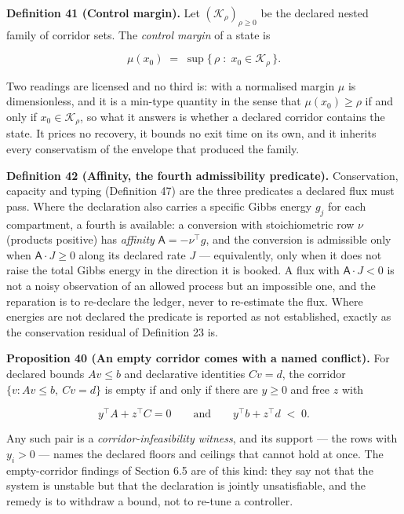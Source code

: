 \documentclass[11pt]{article}
\begin{document}
\textbf{Definition 41 (Control margin).} Let \((\mathcal K_\rho)_{\rho \ge 0}\) be the declared nested family of corridor sets. The \emph{control margin} of a state is 

$$\mu(x_0) \;=\; \sup\{\, \rho \;:\; x_0 \in \mathcal K_\rho \,\}.$$

 Two readings are licensed and no third is: with a normalised margin \(\mu\) is dimensionless, and it is a min-type quantity in the sense that \(\mu(x_0) \ge \rho\) if and only if \(x_0 \in \mathcal K_\rho\), so what it answers is whether a declared corridor contains the state. It prices no recovery, it bounds no exit time on its own, and it inherits every conservatism of the envelope that produced the family.

\textbf{Definition 42 (Affinity, the fourth admissibility predicate).} Conservation, capacity and typing (Definition 47) are the three predicates a declared flux must pass. Where the declaration also carries a specific Gibbs energy \(g_j\) for each compartment, a fourth is available: a conversion with stoichiometric row \(\nu\) (products positive) has \emph{affinity} \(\mathsf{A} = -\nu^{\top} g\), and the conversion is admissible only when \(\mathsf{A} \cdot J \ge 0\) along its declared rate \(J\) --- equivalently, only when it does not raise the total Gibbs energy in the direction it is booked. A flux with \(\mathsf{A} \cdot J < 0\) is not a noisy observation of an allowed process but an impossible one, and the reparation is to re-declare the ledger, never to re-estimate the flux. Where energies are not declared the predicate is reported as not established, exactly as the conservation residual of Definition 23 is.

\textbf{Proposition 40 (An empty corridor comes with a named conflict).} For declared bounds \(A v \le b\) and declarative identities \(C v = d\), the corridor \(\{v : A v \le b,\ C v = d\}\) is empty if and only if there are \(y \ge 0\) and free \(z\) with 

$$y^{\top} A + z^{\top} C = 0 \qquad \text{and} \qquad y^{\top} b + z^{\top} d \;<\; 0 .$$

 Any such pair is a \emph{corridor-infeasibility witness}, and its support --- the rows with \(y_i > 0\) --- names the declared floors and ceilings that cannot hold at once. The empty-corridor findings of Section 6.5 are of this kind: they say not that the system is unstable but that the declaration is jointly unsatisfiable, and the remedy is to withdraw a bound, not to re-tune a controller.
\end{document}
